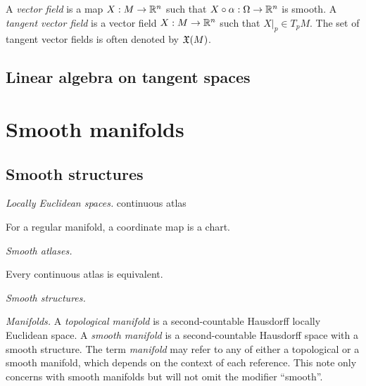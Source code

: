 \documentclass{../note}
\def\a{\alpha}
\begin{document}
A \emph{vector field} is a map $X:M\to\mathbb{R}^n$ such that $X\circ\a:\Omega\to\R^n$ is smooth.
A \emph{tangent vector field} is a vector field $X:M\to\mathbb{R}^n$ such that $X|_p\in T_pM$.
The set of tangent vector fields is often denoted by $\mathfrak{X}(M)$.
\section{Linear algebra on tangent spaces}






\chapter{Smooth manifolds}
\section{Smooth structures}


\begin{prb}\emph{Locally Euclidean spaces.}
continuous atlas
\begin{parts}
\item For a regular manifold, a coordinate map is a chart.
\end{parts}
\end{prb}


\begin{prb}\emph{Smooth atlases.}
\begin{parts}
\item Every continuous atlas is equivalent.
\item 
\end{parts}
\end{prb}


\begin{prb}\emph{Smooth structures.}
\begin{parts}
\item 
\end{parts}
\end{prb}

\begin{prb}\emph{Manifolds.}
A \emph{topological manifold} is a second-countable Hausdorff locally Euclidean space.
A \emph{smooth manifold} is a second-countable Hausdorff space with a smooth structure.
The term \emph{manifold} may refer to any of either a topological or a smooth manifold, which depends on the context of each reference.
This note only concerns with smooth manifolds but will not omit the modifier ``smooth''.
\begin{parts}
\item
\end{parts}
\end{prb}
\end{document}
